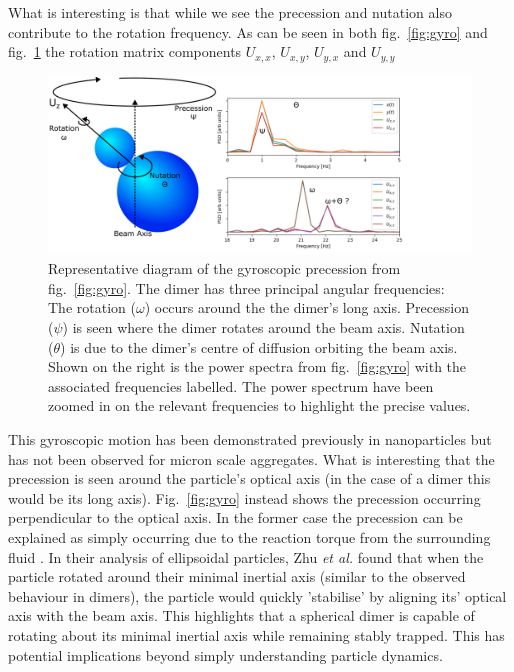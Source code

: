 What is interesting is that while we see the precession and 
nutation also contribute to the rotation frequency. As can be 
seen in both fig.~\ref{fig:gyro} and fig.~\ref{fig:gyro_diagram}
the rotation matrix components $U_{x,x}$, $U_{x,y}$, $U_{y,x}$
and $U_{y,y}$
 

\begin{figure}
	\hspace{-2.3cm}
	\includegraphics[width=1.2\linewidth]{gyroscopic_diagram.pdf}
	\caption{Representative diagram of the gyroscopic precession 
	from fig.~\ref{fig:gyro}. The dimer has three principal angular
	frequencies: The rotation ($\omega$) occurs around the 
	the dimer's long axis. Precession ($\psi$) is seen where the dimer 
	rotates around the beam axis. Nutation ($\theta$) is due to the dimer's 
	centre of diffusion orbiting the beam axis. Shown on the right
	is the power spectra from fig.~\ref{fig:gyro} with the associated 
	frequencies labelled. The power spectrum have been zoomed in on
	the relevant frequencies to highlight the precise values.}
	\label{fig:gyro_diagram}
\end{figure}

This gyroscopic motion has been demonstrated previously in 
nanoparticles \cite{Zhu2021, Rashid2018, Hoang2016, Kuhn2016} 
but has not been observed for micron scale aggregates. What
is interesting that the precession is seen around the particle's
optical axis (in the case of a dimer this would be its long 
axis). Fig.~\ref{fig:gyro} instead shows the precession 
occurring perpendicular to the optical axis. In the former 
case the precession can be explained as simply occurring due 
to the reaction torque from the surrounding fluid \cite{Zhu2021}.
In their analysis of ellipsoidal particles, Zhu \textit{et al.}
found that when the particle rotated around their minimal inertial 
axis (similar to the observed behaviour in dimers), the particle 
would quickly 'stabilise' by aligning its' optical axis with the 
beam axis. This highlights that a spherical dimer is capable of 
rotating about its minimal inertial axis while remaining stably
trapped. This has potential implications beyond simply 
understanding particle dynamics. 

